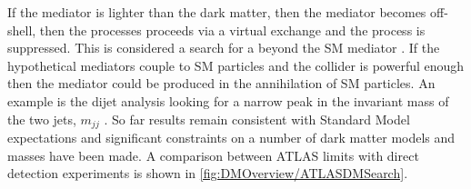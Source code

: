 If the mediator is lighter than the dark matter, then the mediator becomes off-shell, then the processes proceeds via a virtual exchange and the process is suppressed. This is considered a search for a beyond the SM mediator \cite{hteagle:thesis}. If the hypothetical mediators couple to SM particles and the collider is powerful enough then the mediator could be produced in the annihilation of SM particles.  An example is the dijet analysis looking for a narrow peak in the invariant mass of the two jets, $m_{jj}$ \cite{Penning:2017tmb}.
So far results remain consistent with Standard Model expectations \cite{CMS:2017jdm,ATLAS:2016bek} and significant constraints on a number of dark matter models and masses have been made. A comparison between ATLAS limits with direct detection experiments is shown in \autoref{fig:DMOverview/ATLASDMSearch}.

